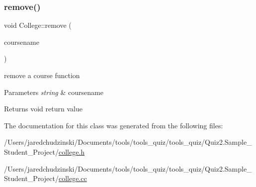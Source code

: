 \subsubsection{\texorpdfstring{remove()}{remove()}}
{\footnotesize\ttfamily void College\+::remove (\begin{DoxyParamCaption}\item[{std\+::string}]{coursename }\end{DoxyParamCaption})}

remove a course function 
\begin{DoxyParams}{Parameters}
{\em string} & coursename \\
\hline
\end{DoxyParams}
\begin{DoxyReturn}{Returns}
void return value 
\end{DoxyReturn}


The documentation for this class was generated from the following files\+:\begin{DoxyCompactItemize}
\item 
/\+Users/jaredchudzinski/\+Documents/tools/tools\+\_\+quiz/tools\+\_\+quiz/\+Quiz2.\+Sample\+\_\+\+Student\+\_\+\+Project/\mbox{\hyperlink{college_8h}{college.\+h}}\item 
/\+Users/jaredchudzinski/\+Documents/tools/tools\+\_\+quiz/tools\+\_\+quiz/\+Quiz2.\+Sample\+\_\+\+Student\+\_\+\+Project/\mbox{\hyperlink{college_8cc}{college.\+cc}}\end{DoxyCompactItemize}
